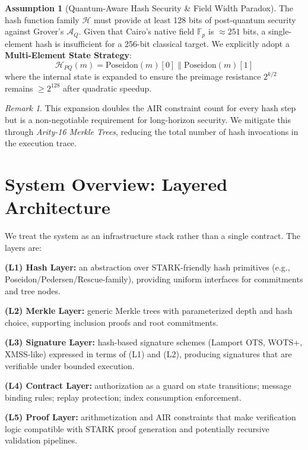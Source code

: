 \documentclass[conference]{IEEEtran}
\theoremstyle{definition}
\newtheorem{assumption}{Assumption}
\theoremstyle{plain}
\theoremstyle{remark}
\newtheorem{remark}{Remark}
\newcommand{\F}{\mathbb{F}}
\newcommand{\concat}{\mathbin{\|}}
\newcommand{\Hash}{\mathcal{H}}
\begin{document}
\begin{assumption}[Quantum-Aware Hash Security \& Field Width Paradox]
\label{assm:hash}
The hash function family $\Hash$ must provide at least 128 bits of post-quantum security against Grover's $\mathcal{A}_Q$. Given that Cairo's native field $\F_p$ is $\approx 251$ bits, a single-element hash is insufficient for a 256-bit classical target. We explicitly adopt a \textbf{Multi-Element State Strategy}: 
\[ \Hash_{PQ}(m) = \text{Poseidon}(m)[0] \concat \text{Poseidon}(m)[1] \]
where the internal state is expanded to ensure the preimage resistance $2^{k/2}$ remains $\geq 2^{128}$ after quadratic speedup.
\end{assumption}

\begin{remark}
This expansion doubles the AIR constraint count for every hash step but is a non-negotiable requirement for long-horizon security. We mitigate this through \emph{Arity-16 Merkle Trees}, reducing the total number of hash invocations in the execution trace.
\end{remark}

\section{System Overview: Layered Architecture}
We treat the system as an infrastructure stack rather than a single contract. The layers are:

\textbf{(L1) Hash Layer:} an abstraction over STARK-friendly hash primitives (e.g., Poseidon/Pedersen/Rescue-family), providing uniform interfaces for commitments and tree nodes.

\textbf{(L2) Merkle Layer:} generic Merkle trees with parameterized depth and hash choice, supporting inclusion proofs and root commitments.

\textbf{(L3) Signature Layer:} hash-based signature schemes (Lamport OTS, WOTS+, XMSS-like) expressed in terms of (L1) and (L2), producing signatures that are verifiable under bounded execution.

\textbf{(L4) Contract Layer:} authorization as a guard on state transitions; message binding rules; replay protection; index consumption enforcement.

\textbf{(L5) Proof Layer:} arithmetization and AIR constraints that make verification logic compatible with STARK proof generation and potentially recursive validation pipelines.
\end{document}

